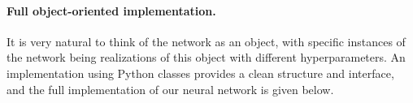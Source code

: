 \paragraph{Full object-oriented implementation.}
It is very natural to think of the network as an object, with specific instances of the network
being realizations of this object with different hyperparameters. An implementation using Python classes provides a clean structure and interface, and the full implementation of our neural network is given below.





































































































